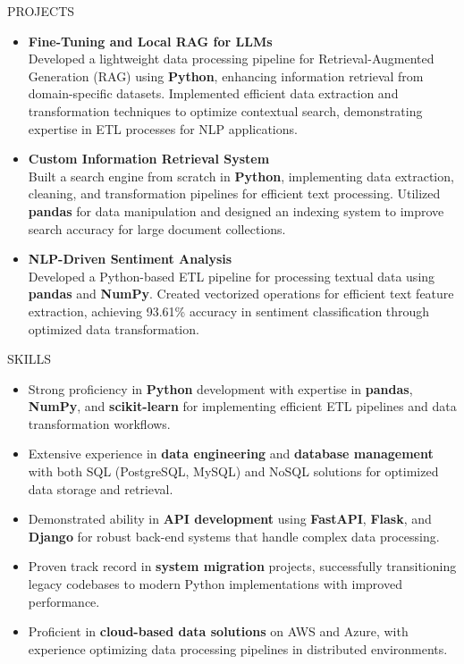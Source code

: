 \documentclass{resume}
\begin{document}
\begin{rSection}{PROJECTS}
\begin{itemize}

\item \textbf{Fine-Tuning and Local RAG for LLMs}\\ 
{Developed a lightweight data processing pipeline for Retrieval-Augmented Generation (RAG) using \textbf{Python}, enhancing information retrieval from domain-specific datasets. Implemented efficient data extraction and transformation techniques to optimize contextual search, demonstrating expertise in ETL processes for NLP applications.}

\item \textbf{Custom Information Retrieval System}\\ 
{Built a search engine from scratch in \textbf{Python}, implementing data extraction, cleaning, and transformation pipelines for efficient text processing. Utilized \textbf{pandas} for data manipulation and designed an indexing system to improve search accuracy for large document collections.}

\item \textbf{NLP-Driven Sentiment Analysis}\\ 
{Developed a Python-based ETL pipeline for processing textual data using \textbf{pandas} and \textbf{NumPy}. Created vectorized operations for efficient text feature extraction, achieving 93.61\% accuracy in sentiment classification through optimized data transformation.}

\end{itemize}
\end{rSection}

\begin{rSection}{SKILLS}

\begin{itemize}
    \item Strong proficiency in \textbf{Python} development with expertise in \textbf{pandas}, \textbf{NumPy}, and \textbf{scikit-learn} for implementing efficient ETL pipelines and data transformation workflows.
    
    \item Extensive experience in \textbf{data engineering} and \textbf{database management} with both SQL (PostgreSQL, MySQL) and NoSQL solutions for optimized data storage and retrieval.
    
    \item Demonstrated ability in \textbf{API development} using \textbf{FastAPI}, \textbf{Flask}, and \textbf{Django} for robust back-end systems that handle complex data processing.
    
    \item Proven track record in \textbf{system migration} projects, successfully transitioning legacy codebases to modern Python implementations with improved performance.
    
    \item Proficient in \textbf{cloud-based data solutions} on AWS and Azure, with experience optimizing data processing pipelines in distributed environments.
\end{itemize}

\end{rSection}
\end{document}
